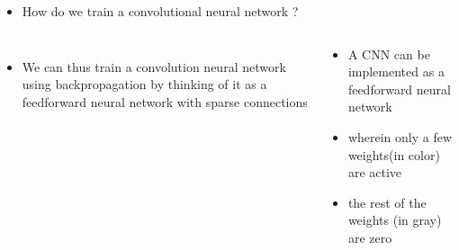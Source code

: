 
\begin{frame}
	\begin{itemize}
		\item How do we train a convolutional neural network ?
	\end{itemize}
\end{frame}


\begin{frame}
	\begin{columns}
		
		\vspace{-0.2in}
		\begin{itemize}
			\item <7-> We can thus train a convolution neural network using backpropagation by thinking of it as a feedforward neural network with sparse connections
		\end{itemize}
		
		\begin{overlayarea}{\textwidth}{\textheight}
			\begin{center}
				
			\end{center}
			\begin{center}
				\begin{itemize}
					\item <1-> A CNN can be implemented as a feedforward neural network
					\item <2-> wherein only a few weights(in color) are active
					\item <3-> the rest of the weights (in gray) are zero
				\end{itemize}
			\end{center}
		\end{overlayarea}
	\end{columns}
\end{frame}



